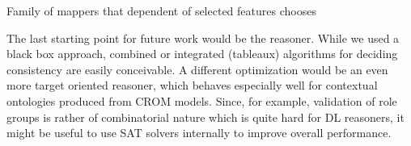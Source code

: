 Family of mappers that dependent of selected features chooses

\vspace*{3cm}

The last starting point for future work would be the reasoner. While we used a black box approach,
combined or integrated  (tableaux) algorithms for deciding consistency are easily conceivable. A different
optimization would be an even more target oriented reasoner, which behaves especially well for
contextual ontologies produced from CROM models. Since, for example, validation of role groups is
rather of combinatorial nature which is quite hard for DL reasoners, it might be useful to use SAT
solvers internally to improve overall performance.





